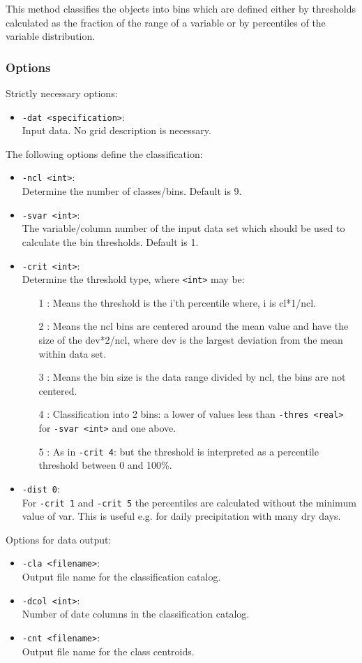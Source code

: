\documentclass[12pt, oneside, a4paper, headsepline, plainheadsepline]{scrbook}
\begin{document}
This method classifies the objects into bins which are defined either by
thresholds calculated as the fraction of the range of a variable or
by percentiles of the variable distribution.

\subsubsection*{Options}
Strictly necessary options:
\begin{itemize}
 \item \verb+-dat <specification>+:\\ Input data. No grid description is necessary.
\end{itemize}
The following options define the classification:
\begin{itemize}
 \item \verb+-ncl <int>+:\\ Determine the number of classes/bins. Default is 9.
 \item \verb+-svar <int>+:\\ The variable/column number of the input data set which should be used to calculate the bin thresholds. Default is 1.
 \item \verb+-crit <int>+:\\ Determine the threshold type, where \verb+<int>+ may be:
 \begin{itemize}
 \item[1]: Means the threshold is the i'th percentile where, i is cl*1/ncl.
 \item[2]: Means the ncl bins are centered around the mean value and have the size of the dev*2/ncl, where dev is the largest deviation from the mean within data set.
 \item[3]: Means the bin size is the data range divided by ncl, the bins are not centered.
 \item[4]: Classification into 2 bins: a lower of values less than \verb+-thres <real>+ for \verb+-svar <int>+ and one above.
 \item[5]: As in \verb+-crit 4+: but the threshold is interpreted as a percentile threshold between 0 and 100\%. 
 \end{itemize}
 \item \verb+-dist 0+:\\ For \verb+-crit 1+ and \verb+-crit 5+ the percentiles are calculated without the minimum value of var. This is useful e.g. for daily 
precipitation with 
many dry days. 
\end{itemize}
Options for data output:
\begin{itemize}
 \item \verb+-cla <filename>+:\\ Output file name for the classification catalog.
 \item \verb+-dcol <int>+:\\ Number of date columns in the classification catalog.
 \item \verb+-cnt <filename>+:\\ Output file name for the class centroids.
\end{itemize}
\end{document}

